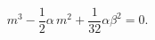 \begin{equation}
m^{3}-\frac{1}{2}\alpha\, m^{2}+\frac{1}{32}\alpha \beta^{2}=0. \label{eqM}
\end{equation}

